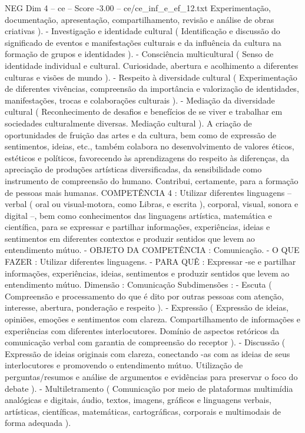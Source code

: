 \begin{textsample}{NEG Dim 4 – ce – Score -3.00 – ce/ce\_inf\_e\_ef\_12.txt}
Experimentação, documentação, apresentação, compartilhamento, revisão e análise de obras criativas ). - Investigação e identidade cultural ( Identificação e discussão do significado de eventos e manifestações culturais e da influência da cultura na formação de grupos e identidades ). - Consciência multicultural ( Senso de identidade individual e cultural.
Curiosidade, abertura e acolhimento a diferentes culturas e visões de mundo ). - Respeito à diversidade cultural ( Experimentação de diferentes vivências, compreensão da importância e valorização de identidades, manifestações, trocas e colaborações culturais ). - Mediação da diversidade cultural ( Reconhecimento de desafios e benefícios de se viver e trabalhar em sociedades culturalmente diversas.
Mediação cultural ).
A criação de oportunidades de fruição das artes e da cultura, bem como de expressão de sentimentos, ideias, etc., também colabora no desenvolvimento de valores éticos, estéticos e políticos, favorecendo às aprendizagens do respeito às diferenças, da apreciação de produções artísticas diversificadas, da sensibilidade como instrumento de compreensão do humano.
Contribui, certamente, para a formação de pessoas mais humanas.
COMPETÊNCIA 4 : Utilizar diferentes linguagens – verbal ( oral ou visual-motora, como Libras, e escrita ), corporal, visual, sonora e digital –, bem como conhecimentos das linguagens artística, matemática e científica, para se expressar e partilhar informações, experiências, ideias e sentimentos em diferentes contextos e produzir sentidos que levem ao entendimento mútuo. - OBJETO DA COMPETÊNCIA : Comunicação. - O QUE FAZER : Utilizar diferentes linguagens. - PARA QUÊ : Expressar -se e partilhar informações, experiências, ideias, sentimentos e produzir sentidos que levem ao entendimento mútuo.
Dimensão : Comunicação Subdimensões : - Escuta ( Compreensão e processamento do que é dito por outras pessoas com atenção, interesse, abertura, ponderação e respeito ). - Expressão ( Expressão de ideias, opiniões, emoções e sentimentos com clareza.
Compartilhamento de informações e experiências com diferentes interlocutores.
Domínio de aspectos retóricos da comunicação verbal com garantia de compreensão do receptor ). - Discussão ( Expressão de ideias originais com clareza, conectando -as com as ideias de seus interlocutores e promovendo o entendimento mútuo.
Utilização de perguntas/resumos e análise de argumentos e evidências para preservar o foco do debate ). - Multiletramento ( Comunicação por meio de plataformas multimídia analógicas e digitais, áudio, textos, imagens, gráficos e linguagens verbais, artísticas, científicas, matemáticas, cartográficas, corporais e multimodais de forma adequada ).

\end{textsample}
